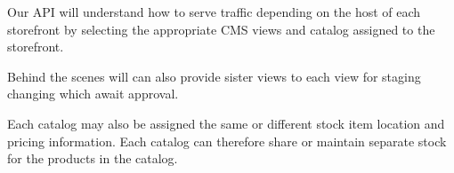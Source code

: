 \documentclass[11pt]{article}
\begin{document}
Our API will understand how to serve traffic depending on the host of each storefront 
by selecting the appropriate CMS views and catalog assigned to the storefront.

Behind the scenes will can also provide sister views to each view for staging changing
which await approval.

Each catalog may also be assigned the same or different stock item location and
pricing information. Each catalog can therefore share or maintain separate stock
for the products in the catalog.
\end{document}
